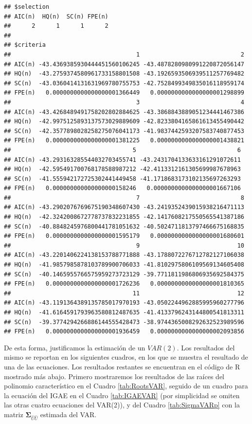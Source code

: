 \documentclass[
]{book}
\begin{document}
\begin{verbatim}
## $selection
## AIC(n)  HQ(n)  SC(n) FPE(n) 
##      2      1      1      2 
## 
## $criteria
##                                    1                             2
## AIC(n) -43.4369385930444451560106245 -43.4878280980991220872056147
## HQ(n)  -43.2759374580961733158801508 -43.1926593506939511257769482
## SC(n)  -43.0360414131631969780755753 -42.7528499349835016118959174
## FPE(n)   0.0000000000000000001366449   0.0000000000000000001298899
##                                    3                             4
## AIC(n) -43.4268489491758202802884625 -43.3868843889051234441467386
## HQ(n)  -42.9975125893137573029889609 -42.8233804165861613455490442
## SC(n)  -42.3577898028258275076041173 -41.9837442593207583740877453
## FPE(n)   0.0000000000000000001381225   0.0000000000000000001438821
##                                   5                             6
## AIC(n) -43.293163285544032703455741 -43.2431704133633161291072611
## HQ(n)  -42.595491700768178588987212 -42.4113312161305699987678963
## SC(n)  -41.555942172725302441449458 -41.1718683173102135697263293
## FPE(n)   0.000000000000000000158246   0.0000000000000000001667106
##                                    7                             8
## AIC(n) -43.2902076769675190348607430 -43.2419352439015938216471113
## HQ(n)  -42.3242008672778737832231855 -42.1417608217550565541387186
## SC(n)  -40.8848245976800441781051632 -40.5024711813797466675168835
## FPE(n)   0.0000000000000000001595179   0.0000000000000000001680601
##                                    9                            10
## AIC(n) -43.2201406224138153788771888 -43.1788072276712782127106038
## HQ(n)  -41.9857985878103789900706033 -41.8102975806109569134605408
## SC(n)  -40.1465955766575959273723129 -39.7711811986806935692584375
## FPE(n)   0.0000000000000000001726236   0.0000000000000000001810365
##                                   11                            12
## AIC(n) -43.1191364389135785017970193 -43.0502244962885995960277796
## HQ(n)  -41.6164591793963580812487635 -41.4133796243144800541813311
## SC(n)  -39.3774294266886144555428473 -38.9744365008292632523989596
## FPE(n)   0.0000000000000000001936459   0.0000000000000000002093856
\end{verbatim}

De esta forma, justificamos la estimación de un \(VAR(2)\). Los resultados
del mismo se reportan en los siguientes cuadros, en los que se muestra
el resultado de una de las ecuaciones. Los resultados restantes se
encuentran en el código de R mostrado más abajo. Primero mostraremos los
resultados de las raíces del polinomio característico en el Cuadro
\ref{tab:RootsVAR}, seguido de un cuadro para la ecuación del IGAE en
el Cuadro \ref{tab:IGAEVAR} (por simplicidad se omiten las otras cuatro
ecuaciones del VAR(2)), y del Cuadro \ref{tab:SigmaVARp} con la matriz
\(\mathbf{\Sigma}_{\hat{U}\hat{U}}\) estimada del VAR.
\end{document}
